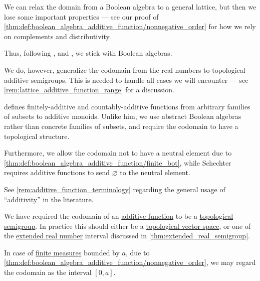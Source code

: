 \begin{comments}
  \item We can relax the domain from a Boolean algebra to a general lattice, but then we lose some important properties --- see our proof of \cref{thm:def:boolean_algebra_additive_function/nonnegative_order} for how we rely on complements and distributivity.

  Thus, following
  \textcite[\S 1.6.4]{Владимиров1969БулевыАлгебры},
  \textcite[\S 2.5.9]{КусраевКутателадзе2005БулевозначныйАнализ} and
  \textcite[ch. 31]{HalmosGivant2009BooleanAlgebras},
  we stick with Boolean algebras.

  We do, however, generalize the codomain from the real numbers to topological additive semigroups. This is needed to handle all cases we will encounter --- see \cref{rem:lattice_additive_function_range} for a discussion.

  \item \Textcite[\S 11.37]{Schechter1997AnalysisHandbook} defines finitely-additive and countably-additive functions from arbitrary families of subsets to additive monoids. Unlike him, we use abstract Boolean algebras rather than concrete families of subsets, and require the codomain to have a topological structure.

  Furthermore, we allow the codomain not to have a neutral element due to \cref{thm:def:boolean_algebra_additive_function/finite_bot}, while Schechter requires additive functions to send \( \varnothing \) to the neutral element.

  \item See \cref{rem:additive_function_terminology} regarding the general usage of \enquote{additivity} in the literature.
\end{comments}

\begin{remark}\label{rem:lattice_additive_function_range}
  We have required the codomain of an \hyperref[def:boolean_algebra_additive_function]{additive function} to be a \hyperref[def:topological_fol_structures]{topological} \hyperref[def:additive_semigroup]{semigroup}. In practice this should either be a \hyperref[def:topological_vector_space]{topological vector space}, or one of the \hyperref[def:extended_real_numbers]{extended real number} interval discussed in \cref{thm:extended_real_semigroup}.

  In case of \hyperref[def:finite_measure]{finite measures} bounded by \( a \), due to \cref{thm:def:boolean_algebra_additive_function/nonnegative_order}, we may regard the codomain as the interval \( [0, a] \).
\end{remark}

